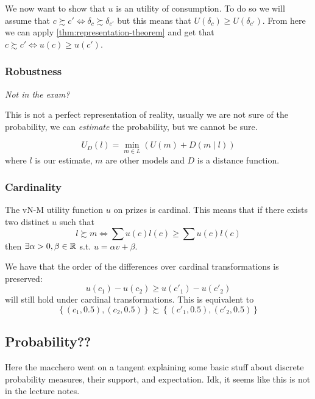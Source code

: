 \documentclass[12pt]{extarticle}
\begin{document}
We now want to show that $u$ is an utility of consumption.
To do so we will assume that $c \succsim c' \iff \delta_c \succsim \delta_{c'}$ but this means that $U(\delta_c) \geq U(\delta_{c'})$.
From here we can apply \cref{thm:representation-theorem} and get that $c \succsim c' \iff u(c) \geq u(c')$.

\subsubsection{Robustness}

\emph{Not in the exam?}

This is not a perfect representation of reality, usually we are not sure of the probability, we can \emph{estimate} the probability, but we cannot be sure.

\begin{equation}
    U_D(l) = \min_{m \in L} \left( U(m) + D(m \mid l) \right)
\end{equation}
where $l$ is our estimate, $m$ are other models and $D$ is a distance function.

\subsubsection{Cardinality}

The vN-M utility function $u$ on prizes is cardinal.
This means that if there exists two distinct $u$ such that
\begin{equation}
    l \succsim m \iff \sum u(c) l(c) \geq \sum u(c) l(c)
\end{equation}
then $\exists \alpha > 0, \beta \in \mathbb{R}$ s.t. $u = \alpha v + \beta$.

We have that the order of the differences over cardinal transformations is preserved:
\begin{equation}
    u(c_1) - u(c_2) \geq u(c'_1) - u(c'_2)
\end{equation}
will still hold under cardinal transformations.
This is equivalent to
\begin{equation}
    \left\{ (c_1, 0.5),  (c_2, 0.5) \right\} \succsim \left\{ (c'_1, 0.5),  (c'_2, 0.5) \right\}
\end{equation}

\subsection{Probability??}

Here the macchero went on a tangent explaining some basic stuff about discrete probability measures, their support, and expectation.
Idk, it seems like this is not in the lecture notes.
\end{document}
